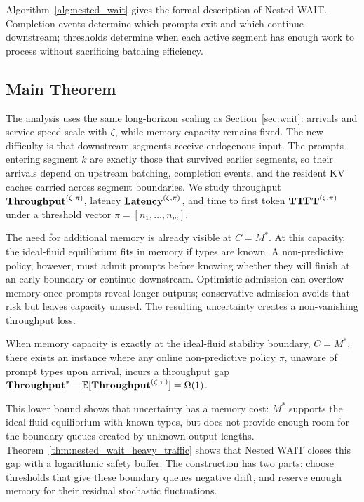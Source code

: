 Algorithm~\ref{alg:nested_wait} gives the formal description of Nested WAIT. Completion events determine which prompts exit and which continue downstream; thresholds determine when each active segment has enough work to process without sacrificing batching efficiency.

\subsection{Main Theorem}
\label{subsec:nested_main_theorem}

The analysis uses the same long-horizon scaling as Section~\ref{sec:wait}: arrivals and service speed scale with \(\zeta\), while memory capacity remains fixed. The new difficulty is that downstream segments receive endogenous input. The prompts entering segment \(k\) are exactly those that survived earlier segments, so their arrivals depend on upstream batching, completion events, and the resident KV caches carried across segment boundaries. We study throughput \(\textbf{Throughput}^{(\zeta,\pi)}\), latency \(\textbf{Latency}^{(\zeta,\pi)}\), and time to first token \(\textbf{TTFT}^{(\zeta,\pi)}\) under a threshold vector \(\pi=[n_1,\dots,n_m]\).

The need for additional memory is already visible at \(C=M^*\). At this capacity, the ideal-fluid equilibrium fits in memory if types are known. A non-predictive policy, however, must admit prompts before knowing whether they will finish at an early boundary or continue downstream. Optimistic admission can overflow memory once prompts reveal longer outputs; conservative admission avoids that risk but leaves capacity unused. The resulting uncertainty creates a non-vanishing throughput loss.

\begin{proposition}
\label{prop:unknown_lower_bound}
When memory capacity is exactly at the ideal-fluid stability boundary, \(C=M^*\), there exists an instance where any online non-predictive policy \( \pi \), unaware of prompt types upon arrival, incurs a throughput gap \( \textbf{Throughput}^* - \mathbb{E}[\textbf{Throughput}^{(\zeta, \pi)}] = \Omega(1) \).
\end{proposition}

This lower bound shows that uncertainty has a memory cost: \(M^*\) supports the ideal-fluid equilibrium with known types, but does not provide enough room for the boundary queues created by unknown output lengths. Theorem~\ref{thm:nested_wait_heavy_traffic} shows that Nested WAIT closes this gap with a logarithmic safety buffer. The construction has two parts: choose thresholds that give these boundary queues negative drift, and reserve enough memory for their residual stochastic fluctuations.

